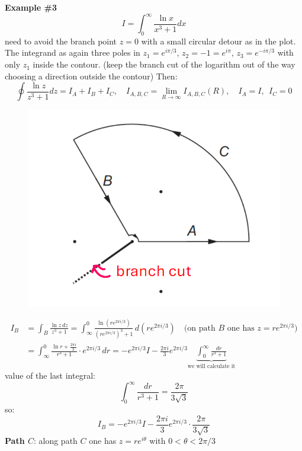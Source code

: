 \documentclass{article}
\begin{document}
\noindent
\textbf{Example \#3}
\begin{equation}
    I = \int_0^\infty \frac{\ln{x}}{x^3 + 1} dx
\end{equation}
need to avoid the branch point $z=0$ with a small circular detour as in the plot. The integrand as again three poles in $z_1 = e^{i\pi/3}$, $z_2 = -1=  e^{i\pi}$, $z_3 = e^{-i\pi/3}$ with only $z_1$ inside the contour. (keep the branch cut of the logarithm out of the way choosing a direction outside the contour) Then:
\begin{equation}
    \oint \frac{\ln{z}}{z^3 + 1}dz = I_A + I_B + I_C, \quad I_{A,B,C} = \lim_{R \rightarrow \infty} I_{A,B,C} (R), \quad I_A = I, \ \ I_C = 0
\end{equation}

\begin{figure}[h]
    \centering
    \includegraphics[width=0.35\linewidth]{fig43.png}
\end{figure}

\newpage

\begin{align*}    
    I_B &= \int_B \frac{\ln z \, dz}{z^3 + 1}
= \int_{\infty}^{0} \frac{\ln\left(r e^{2\pi i / 3}\right)}{\left(r e^{2\pi i / 3}\right)^3 + 1} \, d\left(r e^{2\pi i / 3}\right) \quad \text{(on path $B$ one has $z = re^{2\pi i / 3}$)}\\
& = \int_{\infty}^{0} \frac{\ln r + \frac{2\pi i}{3}}{r^3 + 1} \cdot e^{2\pi i / 3} \, dr
= -e^{2\pi i / 3} I -\frac{2\pi i }{3} e^{2\pi i / 3} \underbrace{\int_0^\infty \frac{dr}{r^3 + 1}}_{\text{we will calculate it}}
\end{align*}
value of the last integral:
\begin{equation}
    \int_0^\infty \frac{dr}{r^3 + 1} = \frac{2\pi}{3\sqrt{3}}
\end{equation}
so:
\begin{equation}
    I_B = - e^{2\pi i / 3} I - \frac{2\pi i }{3} e^{2\pi i / 3} \cdot \frac{2\pi}{3\sqrt{3}}
\end{equation}
\textbf{Path $C$}: along path $C$ one has $z = re^{i\theta}$ with $0<\theta<2\pi/3$
\end{document}
